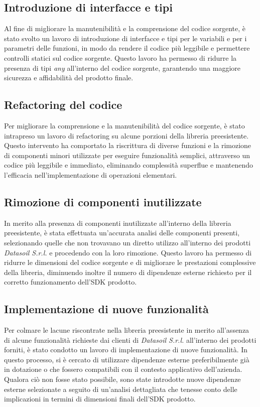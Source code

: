 \subsection{Introduzione di interfacce e tipi}
Al fine di migliorare la manutenibilità e la comprensione del codice sorgente, è stato svolto un lavoro di introduzione di interfacce e tipi per le variabili e per i parametri
delle funzioni, in modo da rendere il codice più leggibile e permettere controlli statici sul codice sorgente. \newline
Questo lavoro ha permesso di ridurre la presenza di tipi \textit{any} all'interno del codice sorgente, garantendo una maggiore sicurezza e affidabilità del prodotto finale.

\subsection{Refactoring del codice}
Per migliorare la comprensione e la manutenibilità del codice sorgente, è stato intrapreso un lavoro di refactoring su alcune porzioni della libreria preesistente.
Questo intervento ha comportato la riscrittura di diverse funzioni e la rimozione di componenti minori utilizzate per eseguire funzionalità semplici, attraverso un codice
più leggibile e immediato, eliminando complessità superflue e mantenendo l'efficacia nell'implementazione di operazioni elementari.

\subsection{Rimozione di componenti inutilizzate}
In merito alla presenza di componenti inutilizzate all'interno della libreria preesistente, è stata effettuata un'accurata analisi delle componenti presenti, selezionando
quelle che non trovavano un diretto utilizzo all'interno dei prodotti \textit{Datasoil S.r.l.} e procedendo con la loro rimozione. \newline
Questo lavoro ha permesso di ridurre le dimensioni del codice sorgente e di migliorare le prestazioni complessive della libreria, diminuendo inoltre il numero di dipendenze
esterne richiesto per il corretto funzionamento dell'SDK prodotto.

\subsection{Implementazione di nuove funzionalità}
Per colmare le lacune riscontrate nella libreria preesistente in merito all'assenza di alcune funzionalità richieste dai clienti di \textit{Datasoil S.r.l.} all'interno dei prodotti forniti,
è stato condotto un lavoro di implementazione di nuove funzionalità. \newline
In questo processo, si è cercato di utilizzare dipendenze esterne preferibilmente già in dotazione o che fossero compatibili con il contesto applicativo dell'azienda. Qualora ciò non
fosse stato possibile, sono state introdotte nuove dipendenze esterne selezionate a seguito di un'analisi dettagliata che tenesse conto delle implicazioni in termini di dimensioni
finali dell'SDK prodotto.


